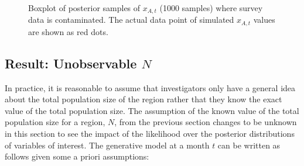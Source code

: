 \documentclass[12pt]{article}
\begin{document}
{\begin{figure}[h]
	\centering
	\caption[Contaminated $p_{A,t}$:: boxplot of posterior samples of $x_{A,t}$]{Boxplot of posterior samples of $x_{A,t}$ (1000 samples) where survey data is contaminated.  The actual data point of simulated $x_{A,t}$ values are shown as red dots.}
	\label{contam_xt}
\end{figure}

\subsection{Result: Unobservable $N$}
In practice, it is reasonable to assume that investigators only have a general idea about the total population size of the region rather that they know the exact value of the total population size. The assumption of the known value of the total population size for a region, $N$, from the previous section changes to be unknown in this section to see the impact of the likelihood over the posterior distributions of variables of interest. The generative model at a month $t$ can be written as follows given some a priori assumptions:

}
\end{document}

